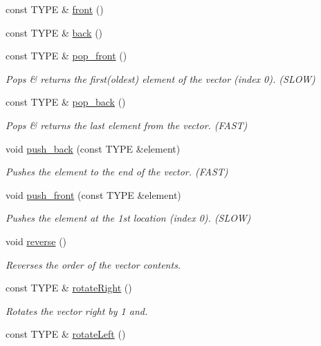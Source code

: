 \begin{DoxyCompactItemize}
const T\+Y\+PE \& \hyperlink{classVECTOR_a461960c2cee36c04d2d35b0e59e00f76}{front} ()
\item 
const T\+Y\+PE \& \hyperlink{classVECTOR_a27dbf9ca2a53b00897d64c92584b72ad}{back} ()
\item 
const T\+Y\+PE \& \hyperlink{classVECTOR_a79ba5d73fa6fc84f32505d789cfb3d38}{pop\+\_\+front} ()
\begin{DoxyCompactList}\small\item\em Pops \& returns the first(oldest) element of the vector (index 0). (S\+L\+OW) \end{DoxyCompactList}\item 
const T\+Y\+PE \& \hyperlink{classVECTOR_a54d00d59fcf5f76472d5e0d97d9fb5ce}{pop\+\_\+back} ()
\begin{DoxyCompactList}\small\item\em Pops \& returns the last element from the vector. (F\+A\+ST) \end{DoxyCompactList}\item 
void \hyperlink{classVECTOR_aa86473de53119987158cebdd5a614f1b}{push\+\_\+back} (const T\+Y\+PE \&element)
\begin{DoxyCompactList}\small\item\em Pushes the element to the end of the vector. (F\+A\+ST) \end{DoxyCompactList}\item 
void \hyperlink{classVECTOR_a6819896c9719227dff566e4ad3c0cfc9}{push\+\_\+front} (const T\+Y\+PE \&element)
\begin{DoxyCompactList}\small\item\em Pushes the element at the 1st location (index 0). (S\+L\+OW) \end{DoxyCompactList}\item 
void \hyperlink{classVECTOR_af0adaf6405892d05beb63fb0d69863b9}{reverse} ()
\begin{DoxyCompactList}\small\item\em Reverses the order of the vector contents. \end{DoxyCompactList}\item 
const T\+Y\+PE \& \hyperlink{classVECTOR_a1fed55a974221c1b79bdafdaadab4f0b}{rotate\+Right} ()
\begin{DoxyCompactList}\small\item\em Rotates the vector right by 1 and. \end{DoxyCompactList}\item 
const T\+Y\+PE \& \hyperlink{classVECTOR_a3870652e987829778f7f1c464a7064b2}{rotate\+Left} ()

\end{DoxyCompactItemize}

